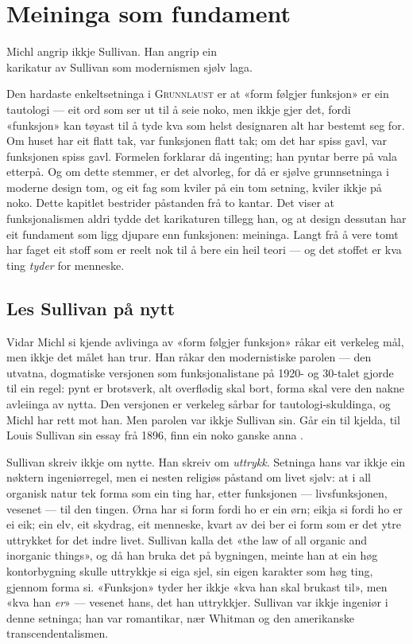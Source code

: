 \chapter{Meininga som fundament}

\begin{motto}
Michl angrip ikkje Sullivan. Han angrip ein\\ karikatur av Sullivan som modernismen sjølv laga.
\end{motto}

Den hardaste enkeltsetninga i \textsc{Grunnlaust} er at «form følgjer funksjon» er ein tautologi — eit ord som ser ut til å seie noko, men ikkje gjer det, fordi «funksjon» kan tøyast til å tyde kva som helst designaren alt har bestemt seg for. Om huset har eit flatt tak, var funksjonen flatt tak; om det har spiss gavl, var funksjonen spiss gavl. Formelen forklarar då ingenting; han pyntar berre på vala etterpå. Og om dette stemmer, er det alvorleg, for då er sjølve grunnsetninga i moderne design tom, og eit fag som kviler på ein tom setning, kviler ikkje på noko. Dette kapitlet bestrider påstanden frå to kantar. Det viser at funksjonalismen aldri tydde det karikaturen tillegg han, og at design dessutan har eit fundament som ligg djupare enn funksjonen: meininga. Langt frå å vere tomt har faget eit stoff som er reelt nok til å bere ein heil teori — og det stoffet er kva ting \emph{tyder} for menneske.

\section{Les Sullivan på nytt}

Vidar Michl si kjende avlivinga av «form følgjer funksjon» råkar eit verkeleg mål, men ikkje det målet han trur. Han råkar den modernistiske parolen — den utvatna, dogmatiske versjonen som funksjonalistane på 1920- og 30-talet gjorde til ein regel: pynt er brotsverk, alt overflødig skal bort, forma skal vere den nakne avleiinga av nytta. Den versjonen er verkeleg sårbar for tautologi-skuldinga, og Michl har rett mot han. Men parolen var ikkje Sullivan sin. Går ein til kjelda, til Louis Sullivan sin essay frå 1896, finn ein noko ganske anna \autocite{sullivan1896tall}.

Sullivan skreiv ikkje om nytte. Han skreiv om \emph{uttrykk}. Setninga hans var ikkje ein nøktern ingeniørregel, men ei nesten religiøs påstand om livet sjølv: at i all organisk natur tek forma som ein ting har, etter funksjonen — livsfunksjonen, vesenet — til den tingen. Ørna har si form fordi ho er ein ørn; eikja si fordi ho er ei eik; ein elv, eit skydrag, eit menneske, kvart av dei ber ei form som er det ytre uttrykket for det indre livet. Sullivan kalla det «the law of all organic and inorganic things», og då han bruka det på bygningen, meinte han at ein høg kontorbygning skulle uttrykkje si eiga sjel, sin eigen karakter som høg ting, gjennom forma si. «Funksjon» tyder her ikkje «kva han skal brukast til», men «kva han \emph{er}» — vesenet hans, det han uttrykkjer. Sullivan var ikkje ingeniør i denne setninga; han var romantikar, nær Whitman og den amerikanske transcendentalismen.

